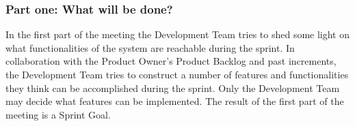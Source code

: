 \subsubsection{Part one: What will be done?}

In the first part of the meeting the Development Team tries to shed some light on what 
functionalities of the system are reachable during the
sprint\cite{scrumguide11}. In collaboration with the Product Owner's Product Backlog and past increments, the Development 
Team tries to construct a number of features and functionalities they think can be 
accomplished during the sprint. Only the Development Team may decide what features can be 
implemented. The result of the first part of the meeting is a Sprint Goal\cite{scrumguide11}.